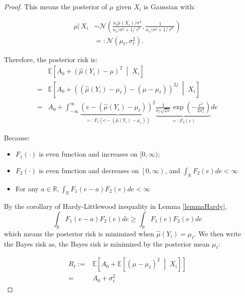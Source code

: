\begin{proof}
This means the posterior of $\mu$ given $X_i$ is Gaussian with:

\begin{align*}
    \mu \lvert\, X_i & \sim \mathcal{N}\left(\frac{n_i \hat{\mu}\left(X_i\right) / \sigma^2}{n_i / \sigma^2+1 / \ell^2}, \frac{1}{n_i / \sigma^2+1 / \ell^2}\right) 
    \\ & =: \mathcal{N}\left(\mu_{\ell}, \sigma_{\ell}^2\right).
\end{align*}



Therefore, the posterior risk is: 
$$
\begin{aligned}
&   \mathbb{E}\left[A_0 + \left(\hat{\mu}\left( Y_i\right)-\mu\right)^{2}  \;\middle|\;  X_i\right] \\ = &  \mathbb{E}\left[A_0 +  \left(\left(\hat{\mu}\left( Y_i\right)-\mu_{\ell}\right)-\left(\mu-\mu_{\ell}\right)\right)^{2 j} \;\middle|\;  X_i\right] \\ =
& A_0+\int_{-\infty}^{\infty} \underbrace{\left(e-\left(\hat{\mu}\left( Y_i\right)-\mu_{\ell}\right)\right)^2}_{=: F_1\left(e-\left(\hat{\mu}\left(Y_i\right)-\mu_{\ell}\right)\right)} \underbrace{\frac{1}{\sigma_{\ell} \sqrt{2 \pi}} \exp \left(-\frac{e^2}{2 \sigma_{\ell}^2}\right)}_{=: F_2(e)} d e
\end{aligned}
$$

Because:
\begin{itemize}
    \item $F_1(\cdot)$ is even function and increases on $[0, \infty)$;
    \item $F_2(\cdot)$ is even function and decreases on $\left[0, \infty \right)$, and $\int_{\mathbb{R}} F_2(e) de<\infty$
    \item For any $a \in \mathbb{R}, \int_{\mathbb{R}} F_1(e-a) F_2(e) de<\infty$
\end{itemize}

By the corollary of Hardy-Littlewood inequality in Lemma \ref{lemmaHardy},
$$
\int_{\mathbb{R}} F_1(e-a) F_2(e) d e \geq \int_{\mathbb{R}} F_1(e) F_2(e) d e
$$
which means the posterior risk is minimized when $\hat{\mu}\left(Y_i\right)=\mu_{\ell}$. We then write the Bayes risk as, the Bayes risk is minimized by the posterior mean $\mu_{\ell}$:

\begin{align*}    
R_{\ell}:= & \mathbb{E}\left[ A_0+\mathbb{E}\left[\left(\mu-\mu_{\ell}\right)^{2 } \;\middle|\;  X_i\right]\right] \\ = & A_0 + \sigma_{\ell}^{2}
\end{align*}


\end{proof}
